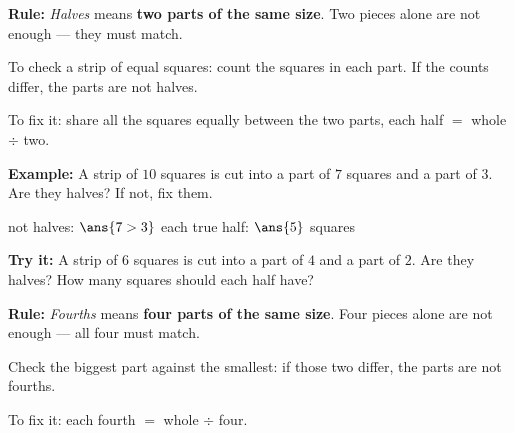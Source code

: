 \documentclass[12pt]{article}
\begin{document}


\begin{formulabox}
\textbf{Rule:} \emph{Halves} means \textbf{two parts of the same size}. Two pieces alone are not enough --- they must match.\par
To check a strip of equal squares: count the squares in each part. If the counts differ, the parts are not halves.\par
To fix it: share all the squares equally between the two parts, \quad each half $=$ whole $\div$ two.
\begin{center}
\end{center}
\end{formulabox}

\begin{examplebox}
\textbf{Example:} \quad A strip of $10$ squares is cut into a part of $7$ squares and a part of $3$. Are they halves? If not, fix them.

not halves: $\ans{7 > 3}$ \qquad each true half: $\ans{5}$ squares
\end{examplebox}

\begin{tryitbox}
\textbf{Try it:} \quad A strip of $6$ squares is cut into a part of $4$ and a part of $2$. Are they halves? How many squares should each half have?\\[2pt]
\end{tryitbox}


\begin{formulabox}
\textbf{Rule:} \emph{Fourths} means \textbf{four parts of the same size}. Four pieces alone are not enough --- all four must match.\par
Check the biggest part against the smallest: if those two differ, the parts are not fourths.\par
To fix it: \quad each fourth $=$ whole $\div$ four.
\end{formulabox}
\end{document}

